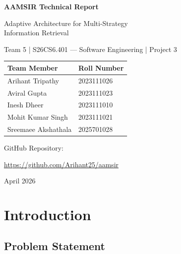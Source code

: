 \documentclass[11pt,a4paper]{article}
\begin{document}
\begin{titlepage}
\centering
\vspace*{2cm}
{\Huge\bfseries AAMSIR Technical Report\par}
\vspace{0.8cm}
{\Large Adaptive Architecture for Multi-Strategy\\Information Retrieval\par}
\vspace{1.5cm}
{\large Team 5 | S26CS6.401 --- Software Engineering | Project 3\par}
\vspace{2cm}

\begin{tabular}{ll}
\toprule
\textbf{Team Member} & \textbf{Roll Number} \\
\midrule
Arihant Tripathy & 2023111026 \\
Aviral Gupta & 2023111023 \\
Inesh Dheer & 2023111010 \\
Mohit Kumar Singh & 2023111021 \\
Sreemaee Akshathala & 2025701028 \\
\bottomrule
\end{tabular}

\vspace{2cm}
{\large GitHub Repository:\par}
\url{https://github.com/Arihant25/aamsir}

\vfill
{\large April 2026\par}
\end{titlepage}

\tableofcontents
\newpage

\section{Introduction}

\subsection{Problem Statement}
\end{document}
